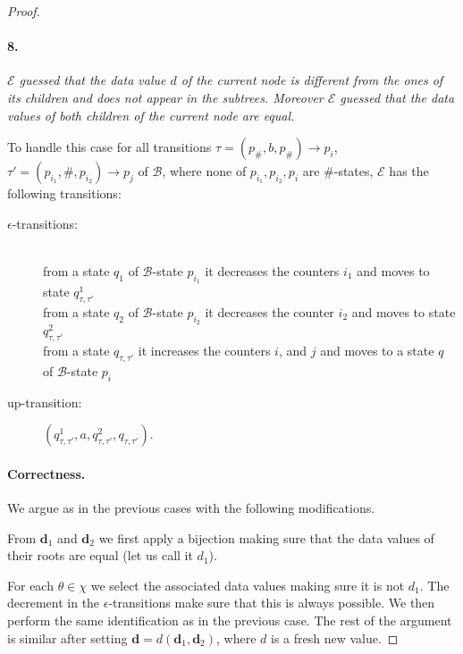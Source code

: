 \documentclass{CSML}
\newcommand\ra{\ensuremath{\rightarrow}}
\newcommand\Ba{\mathcal{B}}
\newcommand\Ea{\mathcal{E}}
\newcommand\dtree{\boldsymbol{d}}
\begin{document}
\begin{proof}
\paragraph{\bf 8.} 
\emph{$\Ea$ guessed that the data value $d$ of the
  current node is different from the ones of its children and does not appear
  in the subtrees.  Moreover $\Ea$ guessed that the data values of both
  children of the current node are equal.}

\noindent
To handle this case for all transitions 
$\tau = (p_{\#},b,p_{\#}) \ra p_{i}$,
$\tau' = (p_{i_1},\#,p_{i_2})\ra p_{j}$ of $\Ba$, 
where none of $p_{i_1},p_{i_2},
p_i$ are $\#$-states, $\Ea$ has the following transitions:
\begin{description}
\item[\rm $\epsilon$-transitions:]\quad\\
from a state $q_1$ of $\Ba$-state $p_{i_1}$
it decreases the counters $i_1$ 
and moves to state $q_{\tau,\tau'}^1$\\
from a state $q_2$ of $\Ba$-state $p_{i_2}$ 
it decreases the counter $i_2$ 
and moves to state $q_{\tau,\tau'}^2$\\
from a state $q_{\tau,\tau'}$ 
it increases the counters $i$, and $j$ 
and moves to a state $q$ of $\Ba$-state $p_i$

\item[\rm up-transition:] $(q_{\tau,\tau'}^1,a,q_{\tau,\tau'}^2,q_{\tau,\tau'})$.
\end{description}

\paragraph{\bf Correctness.}  
We argue as in the previous cases with the following modifications.

From $\dtree_1$ and $\dtree_2$ we first apply a bijection making sure that the
data values of their roots are equal (let us call it $d_1$). 

For each $\theta \in \chi$ we select the associated data values making sure
it is not $d_1$. The decrement in the $\epsilon$-transitions make sure
that this is always possible. We then perform the same identification as in the
previous case. 
The rest of the argument is similar after setting
$\dtree=d(\dtree_1,\dtree_2)$, where $d$ is a fresh new value.


\end{proof}
\end{document}
